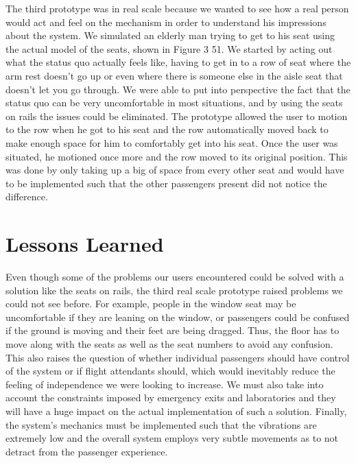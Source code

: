 The third prototype was in real scale because we wanted to see how a real person would act and feel on the mechanism in order to understand his impressions about the system. We simulated an elderly man trying to get to his seat using the actual model of the seats, shown in Figure 3 51. We started by acting out what the status quo actually feels like, having to get in to a row of seat where the arm rest doesn’t go up or even where there is someone else in the aisle seat that doesn’t let you go through. We were able to put into perspective the fact that the status quo can be very uncomfortable in most situations, and by using the seats on rails the issues could be eliminated. The prototype allowed the user to motion to the row when he got to his seat and the row automatically moved back to make enough space for him to comfortably get into his seat. Once the user was situated, he motioned once more and the row moved to its original position. This was done by only taking up a big of space from every other seat and would have to be implemented such that the other passengers present did not notice the difference.

\section*{Lessons Learned}
Even though some of the problems our users encountered could be solved with a solution like the seats on rails, the third real scale prototype raised problems we could not see before.  For example, people in the window seat may be uncomfortable if they are leaning on the window, or passengers could be confused if the ground is moving and their feet are being dragged. Thus, the floor has to move along with the seats as well as the seat numbers to avoid any confusion. This also raises the question of whether individual passengers should have control of the system or if flight attendants should, which would inevitably reduce the feeling of independence we were looking to increase. We must also take into account the constraints imposed by emergency exits and laboratories and they will have a huge impact on the actual implementation of such a solution. Finally, the system’s mechanics must be implemented such that the vibrations are extremely low and the overall system employs very subtle movements as to not detract from the passenger experience. 

